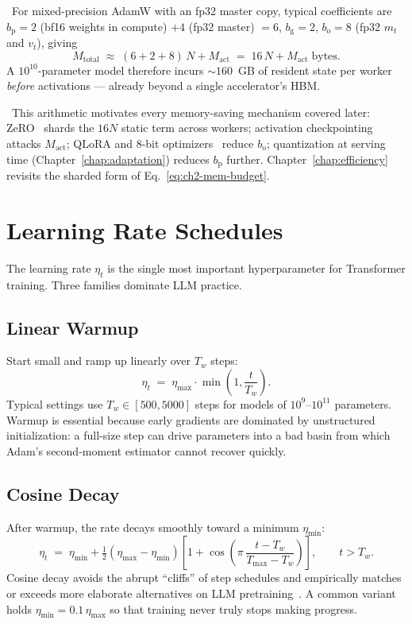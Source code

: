 \Emp\ For mixed-precision AdamW with an fp32 master copy, typical
coefficients are $b_{\mathrm p} = 2$ (bf16 weights in compute) $+ 4$
(fp32 master) $= 6$, $b_{\mathrm g} = 2$, $b_{\mathrm o} = 8$ (fp32
$m_t$ and $v_t$), giving
\[
M_{\mathrm{total}} \;\approx\; (6 + 2 + 8)\,N + M_{\mathrm{act}}
  \;=\; 16\,N + M_{\mathrm{act}}\;\text{bytes}.
\]
A $10^{10}$-parameter model therefore incurs $\sim 160$~GB of
resident state per worker \emph{before} activations — already beyond
a single accelerator's HBM.

\Cons\ This arithmetic motivates every memory-saving mechanism
covered later: ZeRO~\citep{rajbhandari2020zero} shards the $16N$
static term across workers; activation checkpointing attacks
$M_{\mathrm{act}}$; QLoRA and 8-bit optimizers~\citep{dettmers20228bit}
reduce $b_{\mathrm o}$; quantization at serving time (Chapter~\ref{chap:adaptation}) reduces
$b_{\mathrm p}$ further. Chapter~\ref{chap:efficiency} revisits the sharded form of
Eq.~\eqref{eq:ch2-mem-budget}.

\section{Learning Rate Schedules}

The learning rate $\eta_t$ is the single most important hyperparameter
for Transformer training. Three families dominate LLM practice.

\subsection{Linear Warmup}

Start small and ramp up linearly over $T_w$ steps:
\begin{equation}
\eta_t \;=\; \eta_{\max} \cdot \min\!\left(1, \frac{t}{T_w}\right).
\end{equation}
Typical settings use $T_w \in [500, 5000]$ steps for models of
$10^{9}$--$10^{11}$ parameters. Warmup is essential because early
gradients are dominated by unstructured initialization: a full-size step
can drive parameters into a bad basin from which Adam's second-moment
estimator cannot recover quickly.

\subsection{Cosine Decay}

After warmup, the rate decays smoothly toward a minimum $\eta_{\min}$:
\begin{equation}
\eta_t \;=\; \eta_{\min} + \tfrac{1}{2}(\eta_{\max} - \eta_{\min})
            \left[1 + \cos\!\left(\pi\,\frac{t - T_w}{T_{\max} - T_w}\right)\right],
\qquad t > T_w.
\end{equation}
Cosine decay avoids the abrupt ``cliffs'' of step schedules and empirically
matches or exceeds more elaborate alternatives on LLM
pretraining~\citep{loshchilov2017sgdr}. A common variant holds
$\eta_{\min} = 0.1\,\eta_{\max}$ so that training never truly stops making
progress.


